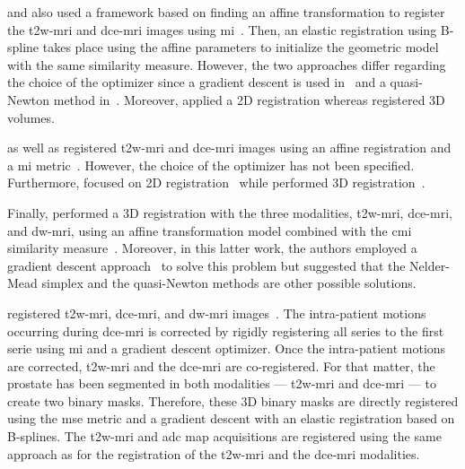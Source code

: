 \begin{enumerate}[leftmargin=*]
\citeauthor{Giannini2013} and also \citeauthor{Vos2010} used a framework based
on finding an affine transformation to register the \ac{t2w}-\ac{mri} and
\ac{dce}-\ac{mri} images using
\ac{mi}~\cite{Rueckert1999,Giannini2013,Vos2010}.
Then, an elastic registration using B-spline takes place using the affine
parameters to initialize the geometric model with the same similarity measure.
However, the two approaches differ regarding the choice of the optimizer since
a gradient descent is used in~\cite{Giannini2013} and a quasi-Newton method
in~\cite{Vos2010}.
Moreover, \citeauthor{Giannini2013} applied a 2D registration whereas
\citeauthor{Vos2010} registered 3D volumes.

\citeauthor{Viswanath2008a} as well as \citeauthor{Vos2008} registered
\ac{t2w}-\ac{mri} and \ac{dce}-\ac{mri} images using an affine registration and
a \ac{mi} metric~\cite{Viswanath2008a,Viswanath2009,Vos2008}.
However, the choice of the optimizer has not been specified.
Furthermore, \citeauthor{Viswanath2008a} focused on 2D
registration~\cite{Viswanath2008a,Viswanath2009} while \citeauthor{Vos2008}
performed 3D registration~\cite{Vos2008}.

Finally, \citeauthor{Viswanath2011} performed a 3D registration with the three
modalities, \ac{t2w}-\ac{mri}, \ac{dce}-\ac{mri}, and \ac{dw}-\ac{mri}, using
an affine transformation model combined with the \ac{cmi} similarity
measure~\cite{Viswanath2011}.
Moreover, in this latter work, the authors employed a gradient descent
approach~\cite{Chappelow2011} to solve this problem but suggested that the
Nelder-Mead simplex and the quasi-Newton methods are other possible solutions.

\citeauthor{Lemaitre2016thesis} registered \ac{t2w}-\ac{mri},
\ac{dce}-\ac{mri}, and \ac{dw}-\ac{mri} images~\cite{Lemaitre2016thesis}.
The intra-patient motions occurring during \ac{dce}-\ac{mri} is corrected by
rigidly registering all series to the first serie using \ac{mi} and a gradient
descent optimizer.
Once the intra-patient motions are corrected, \ac{t2w}-\ac{mri} and the
\ac{dce}-\ac{mri} are co-registered.
For that matter, the prostate has been segmented in both modalities ---
\ac{t2w}-\ac{mri} and \ac{dce}-\ac{mri} --- to create two binary masks.
Therefore, these 3D binary masks are directly registered using the \ac{mse}
metric and a gradient descent with an elastic registration based on B-splines.
The \ac{t2w}-\ac{mri} and \ac{adc} map acquisitions are registered using the
same approach as for the registration of the \ac{t2w}-\ac{mri} and the
\ac{dce}-\ac{mri} modalities.

\end{enumerate}
